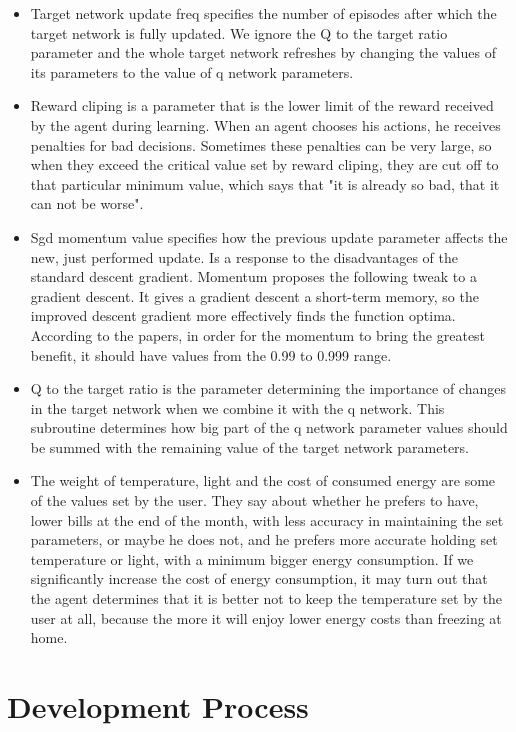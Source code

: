 \documentclass{article}
\begin{document}
\begin{itemize}
\item Target network update freq specifies the number of episodes after which the target network is fully updated.
We ignore the Q to the target ratio parameter and the whole target network refreshes by changing the values of its parameters to the value of q network parameters.

\item Reward cliping is a parameter that is the lower limit of the reward received by the agent during learning. When an agent chooses his actions,
he receives penalties for bad decisions. Sometimes these penalties can be very large, so when they exceed the critical value set by reward cliping, they are cut off to that particular minimum value, which says that "it is already so bad, that it can not be worse".

\item Sgd momentum value specifies how the previous update parameter affects the new, just performed update.
Is a response to the disadvantages of the standard descent gradient. Momentum proposes the following tweak to a gradient descent.
It gives a gradient descent a short-term memory, so the improved descent gradient more effectively finds the function optima. 
According to the papers, in order for the momentum to bring the greatest benefit, it should have values from the 0.99 to 0.999 range.

\item Q to the target ratio is the parameter determining the importance of changes in the target network when we combine it with the q network. This subroutine determines how big part of the q network parameter values should be summed with the remaining value of the target network parameters.

\item The weight of temperature, light and the cost of consumed energy are some of the values set by the user. They say about whether he prefers to have, lower bills at the end of the month, with less accuracy in maintaining the set parameters, or maybe he does not, and he prefers more accurate holding set temperature or light, with a minimum bigger energy consumption.
If we significantly increase the cost of energy consumption, it may turn out that the agent determines that it is better not to keep the temperature set by the user at all, because the more it will enjoy lower energy costs than freezing at home.
\end{itemize}

\section{Development Process}
\end{document}
